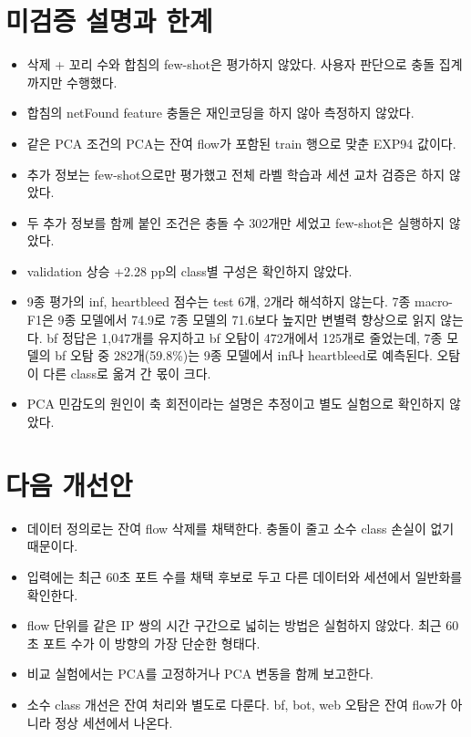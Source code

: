 \section{미검증 설명과 한계}
\begin{itemize}
\item 삭제 + 꼬리 수와 합침의 few-shot은 평가하지 않았다. 사용자 판단으로 충돌 집계까지만 수행했다.
\item 합침의 netFound feature 충돌은 재인코딩을 하지 않아 측정하지 않았다.
\item 같은 PCA 조건의 PCA는 잔여 flow가 포함된 train 행으로 맞춘 EXP94 값이다.
\item 추가 정보는 few-shot으로만 평가했고 전체 라벨 학습과 세션 교차 검증은 하지 않았다.
\item 두 추가 정보를 함께 붙인 조건은 충돌 수 302개만 세었고 few-shot은 실행하지 않았다.
\item validation 상승 +2.28 pp의 class별 구성은 확인하지 않았다.
\item 9종 평가의 inf, heartbleed 점수는 test 6개, 2개라 해석하지 않는다. 7종 macro-F1은 9종 모델에서 74.9로 7종 모델의 71.6보다 높지만 변별력 향상으로 읽지 않는다. bf 정답은 1,047개를 유지하고 bf 오탐이 472개에서 125개로 줄었는데, 7종 모델의 bf 오탐 중 282개(59.8\%)는 9종 모델에서 inf나 heartbleed로 예측된다. 오탐이 다른 class로 옮겨 간 몫이 크다.
\item PCA 민감도의 원인이 축 회전이라는 설명은 추정이고 별도 실험으로 확인하지 않았다.
\end{itemize}

\section{다음 개선안}
\begin{itemize}
\item 데이터 정의로는 잔여 flow 삭제를 채택한다. 충돌이 줄고 소수 class 손실이 없기 때문이다.
\item 입력에는 최근 60초 포트 수를 채택 후보로 두고 다른 데이터와 세션에서 일반화를 확인한다.
\item flow 단위를 같은 IP 쌍의 시간 구간으로 넓히는 방법은 실험하지 않았다. 최근 60초 포트 수가 이 방향의 가장 단순한 형태다.
\item 비교 실험에서는 PCA를 고정하거나 PCA 변동을 함께 보고한다.
\item 소수 class 개선은 잔여 처리와 별도로 다룬다. bf, bot, web 오탐은 잔여 flow가 아니라 정상 세션에서 나온다.
\end{itemize}

